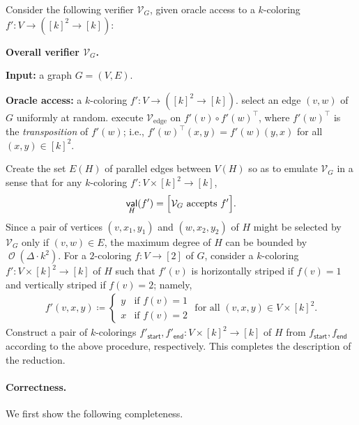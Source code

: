 \documentclass[11pt,fleqn]{article}
\renewcommand{\top}{\intercal}
\newcommand{\defeq}{\coloneq}
\DeclareMathOperator{\bigO}{\mathcal{O}}
\DeclareMathOperator{\val}{\mathsf{val}}
\newcommand{\sss}{\mathsf{start}}
\newcommand{\ttt}{\mathsf{end}}
\newcommand{\V}{\calV}
\newcommand{\f}{f}
\newcommand{\Vedge}{\V_\mathrm{edge}}
\newcommand{\calV}{\mathcal{V}}
\let\Pr\relax\DeclareMathOperator*{\Pr}{\mathbb{P}}
\theoremstyle{definition}
\numberwithin{equation}{section}
\begin{document}
Consider the following verifier $\V_G$,
given oracle access to a $k$-coloring $\f' \colon V \to ([k]^2 \to [k])$:
\begin{itembox}[l]{\textbf{Overall verifier $\V_G$.}}
\begin{algorithmic}[1]
    \item[\textbf{Input:}]
        a graph $G = (V,E)$.
    \item[\textbf{Oracle access:}]
        a $k$-coloring $\f' \colon V \to ([k]^2 \to [k])$.
    \State select an edge $(v,w)$ of $G$ uniformly at random.
    \State execute $\Vedge$ on $\f'(v) \circ \f'(w)^\top$,
    where $\f'(w)^\top$ is the \emph{transposition} of $\f'(w)$; i.e.,
    $\f'(w)^\top(x,y) = \f'(w)(y,x)$ for all $(x,y) \in [k]^2$.
\end{algorithmic}
\end{itembox}
Create the set $E(H)$ of parallel edges between $V(H)$ so as to emulate $\V_G$ in a sense that 
for any $k$-coloring $\f' \colon V \times [k]^2 \to [k]$,
\begin{align}
    \val_H(\f') = \Pr\Bigl[ \V_G \text{ accepts } \f' \Bigr].
\end{align}
Since a pair of vertices $(v,x_1,y_1)$ and $(w,x_2,y_2)$ of $H$
might be selected by $\V_G$ only if
$(v,w) \in E$, 
the maximum degree of $H$ can be bounded by $\bigO(\Delta \cdot k^2)$.
For a $2$-coloring $\f \colon V \to [2]$ of $G$,
consider a $k$-coloring $\f' \colon V \times [k]^2 \to [k]$ of $H$ such that
$\f'(v)$ is horizontally striped if $\f(v)=1$ and
vertically striped if $\f(v)=2$; namely,
\begin{align}
    \f'(v,x,y) \defeq
    \begin{cases}
        y & \text{if } \f(v) = 1 \\
        x & \text{if } \f(v) = 2
    \end{cases}
    \text{ for all } (v,x,y) \in V \times [k]^2.
\end{align}
Construct a pair of $k$-colorings $\f'_\sss, \f'_\ttt \colon V \times [k]^2 \to [k]$ of $H$
from $\f_\sss, \f_\ttt$ according to the above procedure, respectively.
This completes the description of the reduction.


\paragraph{Correctness.}
We first show the following completeness.
\end{document}
